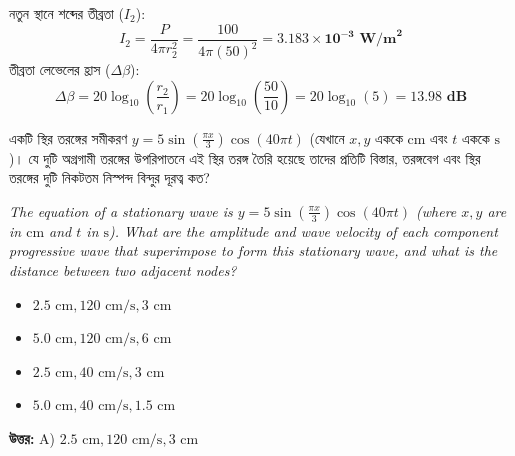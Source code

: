 \documentclass[12pt, a4paper]{article}
\begin{document}
\begin{tcolorbox}[solutionbox={সমাধান (Solution)}]
    \noindent
    নতুন স্থানে শব্দের তীব্রতা ($I_2$):
    \[ I_2 = \frac{P}{4\pi r_2^2} = \frac{100}{4\pi (50)^2} = \mathbf{3.183 \times 10^{-3}\text{ W/m}^2} \]
    তীব্রতা লেভেলের হ্রাস ($\Delta \beta$):
    \[ \Delta \beta = 20 \log_{10}\left(\frac{r_2}{r_1}\right) = 20 \log_{10}\left(\frac{50}{10}\right) = 20 \log_{10}(5) = \mathbf{13.98\text{ dB}} \]
\end{tcolorbox}

\vspace{2em}

\begin{tcolorbox}[questionbox={প্রশ্ন (Question) 18}]
    \noindent
    একটি স্থির তরঙ্গের সমীকরণ $y = 5 \sin \left(\frac{\pi x}{3}\right) \cos (40\pi t)$ (যেখানে $x, y$ এককে $\text{cm}$ এবং $t$ এককে $\text{s}$)। যে দুটি অগ্রগামী তরঙ্গের উপরিপাতনে এই স্থির তরঙ্গ তৈরি হয়েছে তাদের প্রতিটি বিস্তার, তরঙ্গবেগ এবং স্থির তরঙ্গের দুটি নিকটতম নিস্পন্দ বিন্দুর দূরত্ব কত?
    
    \vspace{0.8em}
    \begin{english}
    \noindent\textit{\color{darkgray}
    The equation of a stationary wave is $y = 5 \sin \left(\frac{\pi x}{3}\right) \cos (40\pi t)$ (where $x, y$ are in $\text{cm}$ and $t$ in $\text{s}$). What are the amplitude and wave velocity of each component progressive wave that superimpose to form this stationary wave, and what is the distance between two adjacent nodes?
    }
    \end{english}
\end{tcolorbox}

\begin{itemize}[label={}, leftmargin=1cm, itemsep=0.5em]
    \item[\textbf{A)}] $2.5\text{ cm}, 120\text{ cm/s}, 3\text{ cm}$
    \item[\textbf{B)}] $5.0\text{ cm}, 120\text{ cm/s}, 6\text{ cm}$
    \item[\textbf{C)}] $2.5\text{ cm}, 40\text{ cm/s}, 3\text{ cm}$
    \item[\textbf{D)}] $5.0\text{ cm}, 40\text{ cm/s}, 1.5\text{ cm}$
\end{itemize}

\vspace{0.5em}
\begin{tcolorbox}[answerbox]
    \textbf{\color{success} উত্তর:} A) $2.5\text{ cm}, 120\text{ cm/s}, 3\text{ cm}$
\end{tcolorbox}
\vspace{1em}
\end{document}
